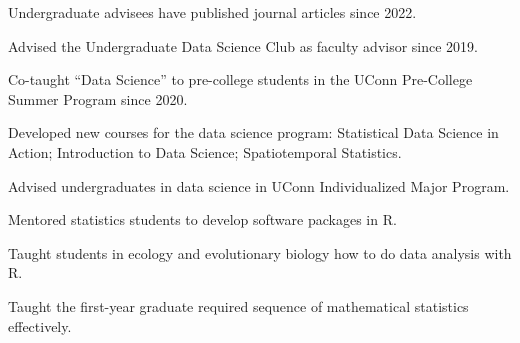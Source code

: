 \documentclass[Statistics]{vita}
\begin{document}
\begin{vita}
\begin{TeachingAccomplishments}
\begin{TeachingHighlights}
    \item Undergraduate advisees have published journal articles since 2022.
    \item Advised the Undergraduate Data Science Club as faculty advisor since 2019.
    \item Co-taught ``Data Science'' to pre-college students in the UConn Pre-College Summer Program since 2020.
    \item Developed new courses for the data science program: Statistical Data Science in Action; Introduction to Data Science; Spatiotemporal Statistics.
    \item Advised undergraduates in data science in UConn Individualized Major Program.
    \item Mentored statistics students to develop software packages in R.
    \item Taught students in ecology and evolutionary biology how to do data analysis with R.
    \item Taught the first-year graduate required sequence of mathematical statistics effectively.
    \end{TeachingHighlights}
  \end{TeachingAccomplishments}

\end{vita}
\end{document}
